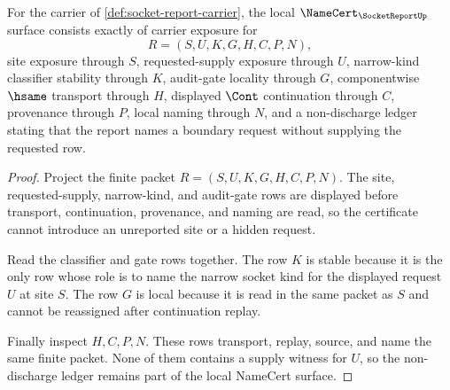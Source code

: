 \begin{theorem}
\label{thm:socket-report-namecert-obligations}
For the carrier of \autoref{def:socket-report-carrier}, the local $\NameCert_{\SocketReportUp}$ surface consists exactly of carrier exposure for
$$
R=(S,U,K,G,H,C,P,N),
$$
site exposure through $S$, requested-supply exposure through $U$, narrow-kind classifier stability through $K$, audit-gate locality through $G$, componentwise $\hsame$ transport through $H$, displayed $\Cont$ continuation through $C$, provenance through $P$, local naming through $N$, and a non-discharge ledger stating that the report names a boundary request without supplying the requested row.
\end{theorem}
\begin{proof}
Project the finite packet $R=(S,U,K,G,H,C,P,N)$. The site, requested-supply, narrow-kind, and audit-gate rows are displayed before transport, continuation, provenance, and naming are read, so the certificate cannot introduce an unreported site or a hidden request.

Read the classifier and gate rows together. The row $K$ is stable because it is the only row whose role is to name the narrow socket kind for the displayed request $U$ at site $S$. The row $G$ is local because it is read in the same packet as $S$ and cannot be reassigned after continuation replay.

Finally inspect $H,C,P,N$. These rows transport, replay, source, and name the same finite packet. None of them contains a supply witness for $U$, so the non-discharge ledger remains part of the local NameCert surface.
\end{proof}

